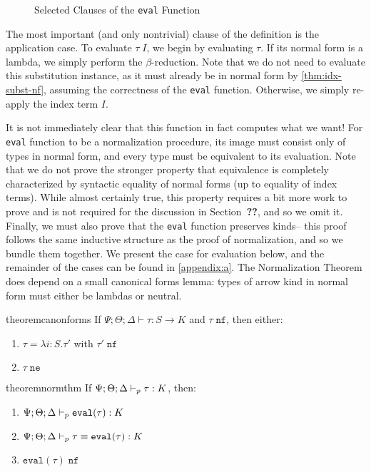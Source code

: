 \begin{figure}

\caption{Selected Clauses of the \texttt{eval} Function}
\label{fig:selected-eval-rules}
\end{figure}

The most important (and only nontrivial) clause of the definition is the application case. To evaluate $\tau \; I$, we begin by evaluating $\tau$. If its normal form
is a lambda, we simply perform the $\beta$-reduction. Note that we do not need to evaluate this substitution instance, as it must already be in normal form by \autoref{thm:idx-subst-nf}, assuming the correctness of the \texttt{eval} function. Otherwise, we simply re-apply the index term $I$.

It is not immediately clear that this function in fact computes what we want! For \texttt{eval} function to be a normalization procedure, its image must consist only of types in normal form, and every type must be equivalent to its evaluation. Note that we do not prove the stronger property that equivalence is completely characterized by syntactic equality of normal forms (up to equality of index terms). While almost certainly true, this property requires a bit more work to prove and is not required for the discussion in Section~\textbf{??}, and so we omit it. Finally, we must also prove that the \texttt{eval} function preserves kinds-- this proof follows the same inductive structure as the proof of normalization, and so we bundle them together. We present the case for evaluation below, and the remainder of the cases can be found in \autoref{appendix:a}. The Normalization Theorem does depend on a small canonical forms lemma: types of arrow kind in normal form must either be lambdas or neutral.

\begin{restatable}{theorem}{canonforms}
If $\Psi ; \Theta ; \Delta \vdash \tau : S \to K$ and $\tau \; \texttt{nf}$, then either:
\begin{enumerate}
  \item $\tau = \lambda i : S.\tau'$ with $\tau' \; \texttt{nf}$
  \item $\tau \; \texttt{ne}$
\end{enumerate}
\end{restatable}


\begin{restatable}{theorem}{normthm}
\label{thm:norm-thm}
If $\Psi ; \Theta ; \Delta \vdash_p \tau : K$, then:
\begin{enumerate}
  \item $\Psi ; \Theta ; \Delta \vdash_p \texttt{eval}(\tau) : K$
  \item $\Psi ; \Theta ; \Delta \vdash_p \tau \equiv \texttt{eval}(\tau) : K$
  \item $\texttt{eval}(\tau) \; \texttt{nf}$
\end{enumerate}
\end{restatable}


